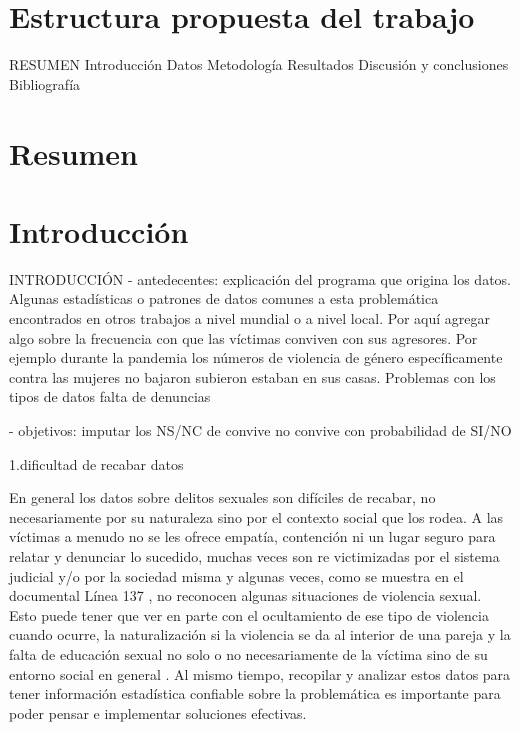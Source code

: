 \documentclass[10pt, spanish]{article}
\begin{document}
\newpage



\listoftodos
\newpage

\section*{Estructura propuesta del trabajo}




RESUMEN
Introducción
Datos
Metodología
Resultados
Discusión y conclusiones
Bibliografía

 

\newpage

\section*{Resumen}





\section{Introducción}\label{intro}

INTRODUCCIÓN 
- antedecentes: explicación del programa que origina los datos. Algunas estadísticas o patrones de datos comunes a esta problemática encontrados en otros trabajos a nivel mundial o a nivel local.
Por aquí agregar algo sobre la frecuencia con que las víctimas conviven con sus agresores. Por ejemplo durante la pandemia los números de violencia de género específicamente contra las mujeres no bajaron subieron estaban en sus casas.
Problemas con los tipos de datos falta de denuncias

- objetivos: imputar los NS/NC de convive no convive con probabilidad de SI/NO  

1.dificultad de recabar datos

En general los datos sobre delitos sexuales son difíciles de recabar, no necesariamente por su naturaleza sino por el contexto social que los rodea. A las víctimas a menudo no se les ofrece empatía, contención ni un lugar seguro para relatar y denunciar lo sucedido, muchas veces son re victimizadas por el sistema judicial y/o por la sociedad misma y algunas veces, como se muestra en el documental Línea 137 \cite{vasallo2020linea137}, no reconocen algunas situaciones de violencia sexual. Esto puede tener que ver en parte con el ocultamiento de ese tipo de violencia cuando ocurre, la naturalización si la violencia se da al interior de una pareja y la falta de educación sexual no solo o no necesariamente de la víctima sino de su entorno social en general \cite{contreras2016violencia}. Al mismo tiempo, recopilar y analizar estos datos para tener información estadística confiable sobre la problemática es importante para poder pensar e implementar soluciones efectivas.
\end{document}
